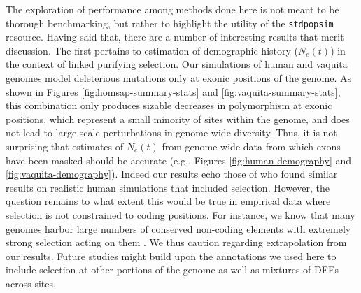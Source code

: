 \documentclass[hidelinks]{article}
\newcommand{\stdpopsim}{\texttt{stdpopsim}\xspace}
\begin{document}
    The exploration of performance among methods done here is not meant to be thorough
    benchmarking, but rather to highlight the utility of the \stdpopsim resource.
    Having said that, there are a number of interesting results that merit discussion.
    The first pertains to estimation of demographic history ($N_e(t)$) in the context of
    linked purifying selection. Our simulations of human and vaquita genomes
    model deleterious mutations only at exonic positions of the genome.
    As shown in Figures \ref{fig:homsap-summary-stats} and \ref{fig:vaquita-summary-stats},
    this combination only produces sizable decreases in polymorphism at exonic positions,
    which represent a small minority of sites within the genome, and does not lead to large-scale
    perturbations in genome-wide diversity. Thus, it is not surprising that estimates of $N_e(t)$
    from genome-wide data from which exons have been masked should be accurate
    (e.g., Figures \ref{fig:human-demography} and \ref{fig:vaquita-demography}).
    Indeed our results echo those of \citet{marsh2024biases} who found 
    similar results on realistic human simulations that included selection.
    However, the question remains to what extent this would be true in empirical data where
    selection is not constrained to coding positions. For instance, we know
    that many genomes harbor large numbers
    of conserved non-coding elements \citep[e.g.,][]{siepel2005evolutionarily} with extremely
    strong selection acting on them \citep{katzman2007human,mclean2008dispensability}.
    We thus caution regarding extrapolation from our results. Future studies might build upon
    the annotations we used here to include selection at other portions of the genome as well
    as mixtures of DFEs across sites.
\end{document}
